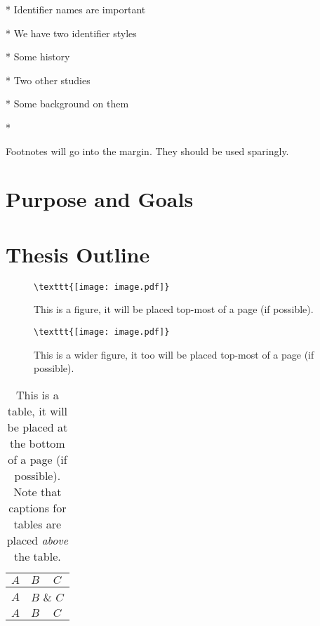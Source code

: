 * Identifier names are important

* We have two identifier styles

* Some history 

* Two other studies

* Some background on them

* 

\begin{MarginNote}[3cm]
  \lipsum[2]

\end{MarginNote}

Footnotes will go into the margin. They should be used sparingly.


\section{Purpose and Goals}

\lipsum[4-6]

\section{Thesis Outline}

\lipsum[7]

\begin{figure}[t]
  \begin{center}
    \vspace*{1em}
    \verb+\texttt{[image: image.pdf]}+
    \vspace*{1em}
  \end{center}
  \caption{This is a figure, it will be placed top-most of a page (if possible).}
  \label{fig:example-1}
\end{figure}

\begin{figure*}[t]
  \begin{center}
    \vspace*{1em}
    \verb+\texttt{[image: image.pdf]}+
    \vspace*{1em}
  \end{center}
\caption{This is a wider figure, it too will be placed top-most of a page (if possible).}
  \label{fig:example-1}
\end{figure*}


\begin{table}[b]
  \caption{This is a table, it will be placed at the bottom of a
    page (if possible). Note that captions for tables are placed
    \emph{above} the table.}
  \begin{center}
    \begin{tabular}{|l|l|l|}
      \hline
      $A$ & $B$ & $C$ \\
      \hline
      $A$ & \multicolumn{2}{|c|}{$B$ \& $C$} \\
      \hline
      $A$ & $B$ & $C$ \\
      \hline
    \end{tabular}
  \end{center}
  
  \label{tab:example-1}
\end{table}